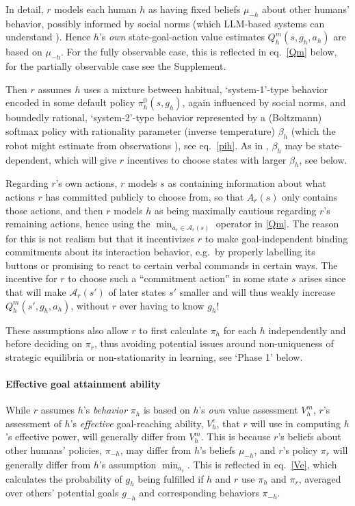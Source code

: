 \documentclass[letterpaper]{article} %
\def\A{\mathcal{A}}
\begin{document}
In detail, $r$ models each human $h$ as having fixed beliefs $\mu_{-h}$ about other humans' behavior, possibly informed by social norms (which LLM-based systems can understand \cite{smith2024concordia}). 
Hence $h$'s {\em own} state-goal-action value estimates $Q^m_h(s,g_h,a_h)$ are based on $\mu_{-h}$. 
For the fully observable case, this is reflected in eq.~\eqref{Qm} below, for the partially observable case see the Supplement.

Then $r$ assumes $h$ uses a mixture between habitual, `system-1'-type behavior encoded in some default policy $\pi^0_h(s,g_h)$, again influenced by social norms, 
and boundedly rational, `system-2'-type behavior represented by a (Boltzmann) softmax policy with rationality parameter (inverse temperature) $\beta_h$ (which the robot might estimate from observations \cite{safari2024classification}), see eq.~\eqref{pih}.
As in \citet{ghosal2023effect}, $\beta_h$ may be state-dependent, which will give $r$ incentives to choose states with larger $\beta_h$, see below. 

Regarding $r$'s own actions, $r$ models $s$ as containing information about what actions $r$ has committed publicly to choose from, so that $A_r(s)$ only contains those actions, and then $r$ models $h$ as being maximally cautious regarding $r$'s remaining actions, hence using the $\min_{a_r\in\A_r(s)}$ operator in \eqref{Qm}.
The reason for this is not realism but that it incentivizes $r$ to make goal-independent binding commitments about its interaction behavior, e.g.~by properly labelling its buttons or promising to react to certain verbal commands in certain ways.
The incentive for $r$ to choose such a ``commitment action'' in some state $s$ arises since that will make $\A_r(s')$ of later states $s'$ smaller and will thus weakly increase $Q^m_h(s',g_h,a_h)$, without $r$ ever having to know $g_h$!

These assumptions also allow $r$ to first calculate $\pi_h$ for each $h$ independently and before deciding on $\pi_r$, thus avoiding potential issues around non-uniqueness of strategic equilibria or non-stationarity in learning, see `Phase 1' below.

\paragraph{Effective goal attainment ability}
While $r$ assumes $h$'s {\em behavior} $\pi_h$ is based on $h$'s {\em own} value assessment $V^m_h$, 
$r$'s assessment of $h$'s {\em effective} goal-reaching ability, $V^e_h$, that $r$ will use in computing $h$'s effective power, 
will generally differ from $V^m_h$.
This is because $r$'s beliefs about other humans' policies, $\pi_{-h}$, may differ from $h$'s beliefs $\mu_{-h}$, and $r$'s policy $\pi_r$ will generally differ from $h$'s assumption $\min_{a_r}$. 
This is reflected in eq.~\eqref{Ve}, which calculates the probability of $g_h$ being fulfilled if $h$ and $r$ use $\pi_h$ and $\pi_r$, averaged over others' potential goals $g_{-h}$ and corresponding behaviors $\pi_{-h}$.
\end{document}
